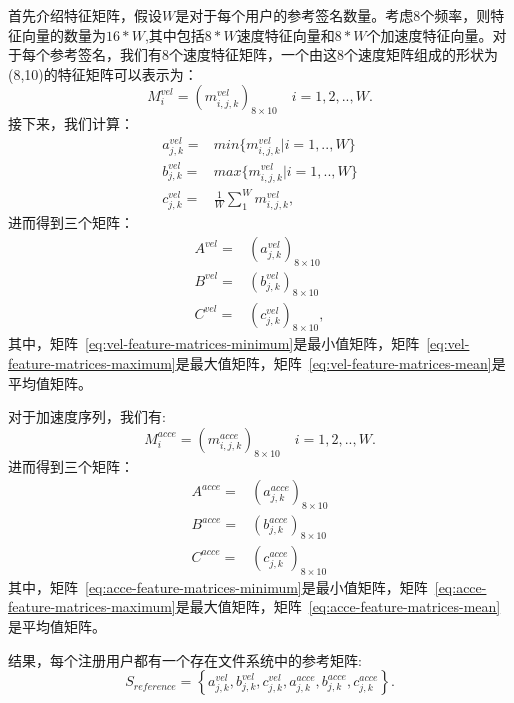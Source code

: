 首先介绍特征矩阵，假设$W$是对于每个用户的参考签名数量。考虑8个频率，则特征向量的数量为$16*W$,其中包括$8*W$速度特征向量和$8*W$个加速度特征向量。对于每个参考签名，我们有8个速度特征矩阵，一个由这8个速度矩阵组成的形状为(8,10)的特征矩阵可以表示为：
$$
M_{i}^{vel}=\left( m^{vel}_{i,j,k}\right)_{8\times10} \quad i=1,2,..,W.
$$
接下来，我们计算：
\begin{align} \nonumber
   a_{j,k}^{vel} =& min\{m^{vel}_{i,j,k}|i=1,..,W\} \\
   b_{j,k}^{vel} =& max\{m^{vel}_{i,j,k}|i=1,..,W\} \\
   c_{j,k}^{vel} =& \frac{1}{W}\sum_{1}^{W}m^{vel}_{i,j,k},
\end{align}
进而得到三个矩阵：
\begin{align}
A^{vel} =& \left(a_{j,k}^{vel}  \right)_{8\times10} \label{eq:vel-feature-matrices-minimum}\\  
B^{vel} =& \left( b_{j,k}^{vel} \right)_{8\times 10} \label{eq:vel-feature-matrices-maximum}\\ 
C^{vel} =& \left( c_{j,k}^{vel} \right)_{8\times 10} ,  \label{eq:vel-feature-matrices-mean}
\end{align}
其中，矩阵~\ref{eq:vel-feature-matrices-minimum}是最小值矩阵，矩阵~\ref{eq:vel-feature-matrices-maximum}是最大值矩阵，矩阵~\ref{eq:vel-feature-matrices-mean}是平均值矩阵。

对于加速度序列，我们有:
$$
M_{i}^{acce}=\left( m^{acce}_{i,j,k}\right)_{8\times10} \quad i=1,2,..,W.
$$
进而得到三个矩阵：
\begin{align}
A^{acce} =& \left(a_{j,k}^{acce}  \right)_{8\times10}  \label{eq:acce-feature-matrices-minimum} \\
B^{acce} =& \left( b_{j,k}^{acce} \right)_{8\times10}  \label{eq:acce-feature-matrices-maximum} \\
C^{acce} =& \left( c_{j,k}^{acce} \right)_{8\times 10} \label{eq:acce-feature-matrices-mean}
\end{align}
其中，矩阵~\ref{eq:acce-feature-matrices-minimum}是最小值矩阵，矩阵~\ref{eq:acce-feature-matrices-maximum}是最大值矩阵，矩阵~\ref{eq:acce-feature-matrices-mean}是平均值矩阵。

结果，每个注册用户都有一个存在文件系统中的参考矩阵:
$$
S_{reference}=\left\{ a_{j,k}^{vel},b_{j,k}^{vel},c_{j,k}^{vel},a_{j,k}^{acce},b_{j,k}^{acce},c_{j,k}^{acce} \right\}.
$$

